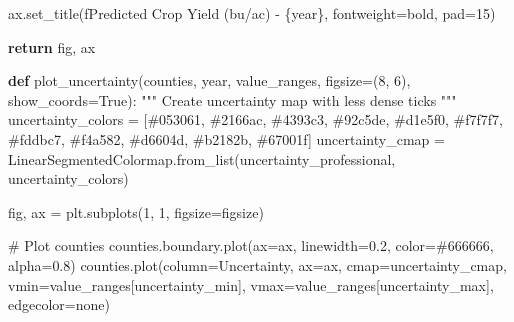 \documentclass[
  letterpaper,
  DIV=11,
  numbers=noendperiod]{scrreprt}
\newenvironment{Shaded}{\begin{snugshade}}{\end{snugshade}}
\newcommand{\CommentTok}[1]{\textcolor[rgb]{0.37,0.37,0.37}{#1}}
\newcommand{\ControlFlowTok}[1]{\textcolor[rgb]{0.00,0.23,0.31}{\textbf{#1}}}
\newcommand{\DecValTok}[1]{\textcolor[rgb]{0.68,0.00,0.00}{#1}}
\newcommand{\FloatTok}[1]{\textcolor[rgb]{0.68,0.00,0.00}{#1}}
\newcommand{\KeywordTok}[1]{\textcolor[rgb]{0.00,0.23,0.31}{\textbf{#1}}}
\newcommand{\NormalTok}[1]{\textcolor[rgb]{0.00,0.23,0.31}{#1}}
\newcommand{\OperatorTok}[1]{\textcolor[rgb]{0.37,0.37,0.37}{#1}}
\newcommand{\SpecialCharTok}[1]{\textcolor[rgb]{0.37,0.37,0.37}{#1}}
\newcommand{\SpecialStringTok}[1]{\textcolor[rgb]{0.13,0.47,0.30}{#1}}
\newcommand{\StringTok}[1]{\textcolor[rgb]{0.13,0.47,0.30}{#1}}
\newcommand{\VariableTok}[1]{\textcolor[rgb]{0.07,0.07,0.07}{#1}}
\begin{document}
\begin{Shaded}
\begin{Highlighting}[]
\NormalTok{    ax.set\_title(}\SpecialStringTok{f\textquotesingle{}Predicted Crop Yield (bu/ac) {-} }\SpecialCharTok{\{}\NormalTok{year}\SpecialCharTok{\}}\SpecialStringTok{\textquotesingle{}}\NormalTok{, fontweight}\OperatorTok{=}\StringTok{\textquotesingle{}bold\textquotesingle{}}\NormalTok{, pad}\OperatorTok{=}\DecValTok{15}\NormalTok{)}

    \ControlFlowTok{return}\NormalTok{ fig, ax}

\KeywordTok{def}\NormalTok{ plot\_uncertainty(counties, year, value\_ranges, figsize}\OperatorTok{=}\NormalTok{(}\DecValTok{8}\NormalTok{, }\DecValTok{6}\NormalTok{), show\_coords}\OperatorTok{=}\VariableTok{True}\NormalTok{):}
    \CommentTok{"""}
\CommentTok{    Create uncertainty map with less dense ticks}
\CommentTok{    """}
\NormalTok{    uncertainty\_colors }\OperatorTok{=}\NormalTok{ [}\StringTok{\textquotesingle{}\#053061\textquotesingle{}}\NormalTok{, }\StringTok{\textquotesingle{}\#2166ac\textquotesingle{}}\NormalTok{, }\StringTok{\textquotesingle{}\#4393c3\textquotesingle{}}\NormalTok{, }\StringTok{\textquotesingle{}\#92c5de\textquotesingle{}}\NormalTok{, }\StringTok{\textquotesingle{}\#d1e5f0\textquotesingle{}}\NormalTok{,}
                         \StringTok{\textquotesingle{}\#f7f7f7\textquotesingle{}}\NormalTok{, }\StringTok{\textquotesingle{}\#fddbc7\textquotesingle{}}\NormalTok{, }\StringTok{\textquotesingle{}\#f4a582\textquotesingle{}}\NormalTok{, }\StringTok{\textquotesingle{}\#d6604d\textquotesingle{}}\NormalTok{, }\StringTok{\textquotesingle{}\#b2182b\textquotesingle{}}\NormalTok{, }\StringTok{\textquotesingle{}\#67001f\textquotesingle{}}\NormalTok{]}
\NormalTok{    uncertainty\_cmap }\OperatorTok{=}\NormalTok{ LinearSegmentedColormap.from\_list(}\StringTok{\textquotesingle{}uncertainty\_professional\textquotesingle{}}\NormalTok{, uncertainty\_colors)}

\NormalTok{    fig, ax }\OperatorTok{=}\NormalTok{ plt.subplots(}\DecValTok{1}\NormalTok{, }\DecValTok{1}\NormalTok{, figsize}\OperatorTok{=}\NormalTok{figsize)}

    \CommentTok{\# Plot counties}
\NormalTok{    counties.boundary.plot(ax}\OperatorTok{=}\NormalTok{ax, linewidth}\OperatorTok{=}\FloatTok{0.2}\NormalTok{, color}\OperatorTok{=}\StringTok{\textquotesingle{}\#666666\textquotesingle{}}\NormalTok{, alpha}\OperatorTok{=}\FloatTok{0.8}\NormalTok{)}
\NormalTok{    counties.plot(column}\OperatorTok{=}\StringTok{\textquotesingle{}Uncertainty\textquotesingle{}}\NormalTok{,}
\NormalTok{                 ax}\OperatorTok{=}\NormalTok{ax,}
\NormalTok{                 cmap}\OperatorTok{=}\NormalTok{uncertainty\_cmap,}
\NormalTok{                 vmin}\OperatorTok{=}\NormalTok{value\_ranges[}\StringTok{\textquotesingle{}uncertainty\_min\textquotesingle{}}\NormalTok{],}
\NormalTok{                 vmax}\OperatorTok{=}\NormalTok{value\_ranges[}\StringTok{\textquotesingle{}uncertainty\_max\textquotesingle{}}\NormalTok{],}
\NormalTok{                 edgecolor}\OperatorTok{=}\StringTok{\textquotesingle{}none\textquotesingle{}}\NormalTok{)}


\end{Highlighting}
\end{Shaded}
\end{document}
